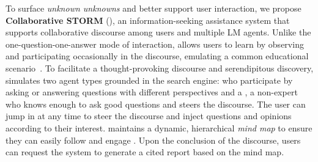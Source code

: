 To surface \textit{unknown unknowns} and better support user interaction, we propose \textbf{Collaborative STORM} (\textbf{\system}), an information-seeking assistance system that supports collaborative discourse among users and multiple LM agents. Unlike the one-question-one-answer mode of interaction, \system allows users to learn by observing and participating occasionally in the discourse, emulating a common educational scenario~\citep{nussbaum2008collaborative}. 
To facilitate a thought-provoking discourse and serendipitous discovery, \system simulates two agent types grounded in the search engine: \textit{\experts} who participate by asking or answering questions with different perspectives and a \textit{\moderator}, a non-expert who knows enough to ask good questions and steers the discourse. The user can jump in at any time to steer the discourse and inject questions and opinions according to their interest.  \system maintains a dynamic, hierarchical \textit{mind map} to ensure they can easily follow and engage \citep{buzan1974noting}. 
Upon the conclusion of the discourse, users can request the system to generate a cited report based on the mind map. 




